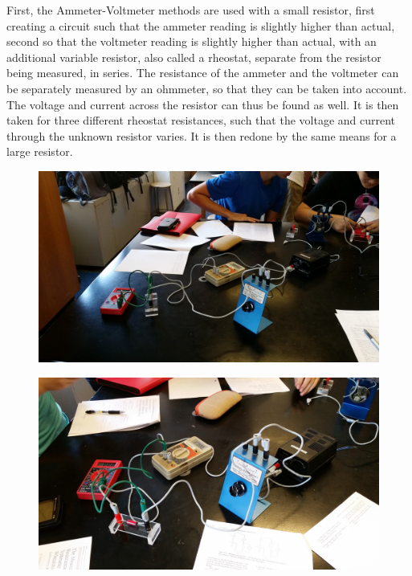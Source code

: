 \documentclass[11pt, titlepage]{article}
\begin{document}
First, the Ammeter-Voltmeter methods are used with a small resistor, first creating a circuit such that the ammeter reading is slightly higher than actual, second so that the voltmeter reading is slightly higher than actual, with an additional variable resistor, also called a rheostat, separate from the resistor being measured, in series. The resistance of the ammeter and the voltmeter can be separately measured by an ohmmeter, so that they can be taken into account. The voltage and current across the resistor can thus be found as well. It is then taken for three different rheostat resistances, such that the voltage and current through the unknown resistor varies. It is then redone by the same means for a large resistor.

\begin{figure}[h]
\centering
\hspace*{0cm}
\includegraphics[scale=0.12, angle=90]{lab11.jpg}
\vspace*{0cm}
\end{figure}

\begin{figure}[h]
\centering
\hspace*{0cm}
\includegraphics[scale=0.12, angle=270]{lab12.jpg}
\vspace*{0cm}
\end{figure}
\end{document}
